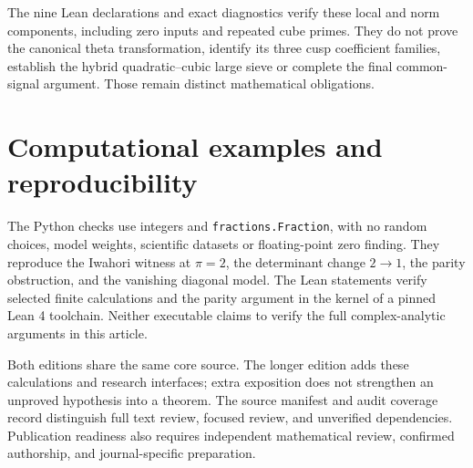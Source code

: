 The nine Lean declarations and exact diagnostics verify these local and
norm components, including zero inputs and repeated cube primes.
They do not prove the canonical theta transformation, identify its three
cusp coefficient families, establish the hybrid quadratic--cubic large
sieve or complete the final common-signal argument. Those remain distinct
mathematical obligations.

\section{Computational examples and reproducibility}
The Python checks use integers and \texttt{fractions.Fraction}, with
no random choices, model weights, scientific datasets or floating-point
zero finding. They reproduce the Iwahori witness at $\pi=2$, the determinant
change $2\to1$, the parity obstruction, and the vanishing diagonal model.
The Lean statements verify selected finite calculations and the parity
argument in the kernel of a pinned Lean 4 toolchain. Neither executable
claims to verify the full complex-analytic arguments in this article.

Both editions share the same core source. The longer edition adds these
calculations and research interfaces; extra exposition does not strengthen
an unproved hypothesis into a theorem. The source manifest and audit
coverage record distinguish full text review, focused review, and
unverified dependencies. Publication readiness also requires independent
mathematical review, confirmed authorship, and journal-specific preparation.



